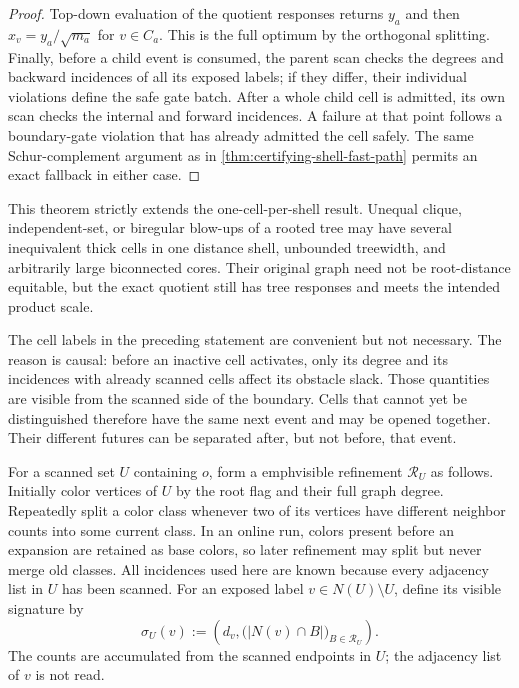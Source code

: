 \begin{proof}
Top-down evaluation of the quotient responses returns $y_a$ and then
$x_v=y_a/\sqrt{m_a}$ for $v\in C_a$.  This is the full optimum by the
orthogonal splitting.  Finally, before a child event is consumed, the parent
scan checks the degrees and backward incidences of all its exposed labels; if
they differ, their individual violations define the safe gate batch.  After a
whole child cell is admitted, its own scan checks the internal and forward
incidences.  A failure at that point follows a boundary-gate violation that
has already admitted the cell safely.  The same Schur-complement argument as
in \cref{thm:certifying-shell-fast-path} permits an exact fallback in either
case.
\end{proof}

This theorem strictly extends the one-cell-per-shell result.  Unequal
clique, independent-set, or biregular blow-ups of a rooted tree may have
several inequivalent thick cells in one distance shell, unbounded treewidth,
and arbitrarily large biconnected cores.  Their original graph need not be
root-distance equitable, but the exact quotient still has tree responses and
meets the intended product scale.

The cell labels in the preceding statement are convenient but not necessary.
The reason is causal: before an inactive cell activates, only its degree and
its incidences with already scanned cells affect its obstacle slack.  Those
quantities are visible from the scanned side of the boundary.  Cells that
cannot yet be distinguished therefore have the same next event and may be
opened together.  Their different futures can be separated after, but not
before, that event.

For a scanned set $U$ containing $o$, form a emph{visible refinement}
$\mathcal R_U$ as follows.  Initially color vertices of $U$ by the root flag
and their full graph degree.  Repeatedly split a color class whenever two of
its vertices have different neighbor counts into some current class.  In an
online run, colors present before an expansion are retained as base colors,
so later refinement may split but never merge old classes.  All incidences
used here are known because every adjacency list in $U$ has been scanned.
For an exposed label $v\in N(U)\setminus U$, define its visible signature
by
\begin{equation}
 \sigma_U(v)
 :=\left(
   d_v,
   \bigl(|N(v)\cap B|\bigr)_{B\in\mathcal R_U}
 \right).
 \label{eq:visible-boundary-signature}
\end{equation}
The counts are accumulated from the scanned endpoints in $U$; the adjacency
list of $v$ is not read.

